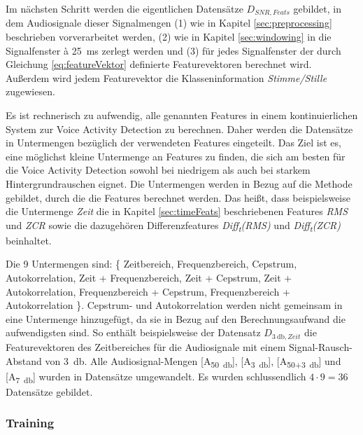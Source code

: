 Im nächsten Schritt werden die eigentlichen Datensätze $D_{SNR,Feats}$ gebildet, in dem Audiosignale dieser Signalmengen (1) wie in Kapitel \ref{sec:preprocessing} beschrieben vorverarbeitet werden, (2) wie in Kapitel \ref{sec:windowing} in die Signalfenster \`{a} \SI{25}{\milli\second} zerlegt werden und (3) für jedes Signalfenster der durch Gleichung \ref{eq:featureVektor} definierte Featurevektoren berechnet wird. Außerdem wird jedem Featurevektor die Klasseninformation \emph{Stimme/Stille} zugewiesen.

Es ist rechnerisch zu aufwendig, alle genannten Features in einem kontinuierlichen System zur Voice Activity Detection zu berechnen. Daher werden die Datensätze in Untermengen bezüglich der verwendeten Features eingeteilt. Das Ziel ist es, eine möglichst kleine Untermenge an Features zu finden, die sich am besten für die Voice Activity Detection sowohl bei niedrigem als auch bei starkem Hintergrundrauschen eignet. Die Untermengen werden in Bezug auf die Methode gebildet, durch die die Features berechnet werden. Das heißt, dass beispielsweise die Untermenge \emph{Zeit} die in Kapitel \ref{sec:timeFeats} beschriebenen Features \emph{RMS} und \emph{ZCR} sowie die dazugehören Differenzfeatures \emph{Diff\textsubscript{t}(RMS)} und \emph{Diff\textsubscript{t}(ZCR)} beinhaltet. 

Die 9 Untermengen sind: \{ Zeitbereich, Frequenzbereich, Cepstrum, Autokorrelation, Zeit + Frequenzbereich, Zeit + Cepstrum, Zeit + Autokorrelation, Frequenzbereich + Cepstrum, Frequenzbereich + Autokorrelation \}. Cepstrum- und Autokorrelation werden nicht gemeinsam in eine Untermenge hinzugefügt, da sie in Bezug auf den Berechnungsaufwand die aufwendigsten sind. So enthält beispielsweise der Datensatz $D_{\SI{3}{\decibel},Zeit}$ die Featurevektoren des Zeitbereiches für die Audiosignale mit einem Signal-Rausch-Abstand von \SI{3}{\decibel}. Alle Audiosignal-Mengen [A\textsubscript{\SI{50}{\decibel}}], [A\textsubscript{\SI{3}{\decibel}}], [A\textsubscript{50+\SI{3}{\decibel}}] und [A\textsubscript{\SI{7}{\decibel}}] wurden in Datensätze umgewandelt. Es wurden schlussendlich $4 \cdot 9 = 36$ Datensätze gebildet.

\subsubsection{Training} 
\label{sec:training}

